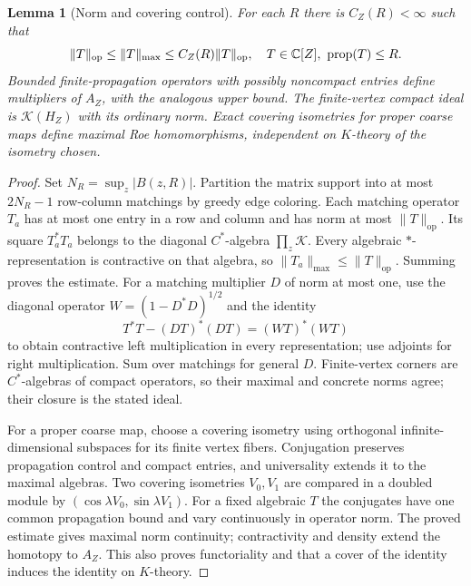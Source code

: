 \documentclass[11pt]{article}
\newtheorem{lemma}[theorem]{Lemma}
\theoremstyle{remark}\newtheorem{remark}[theorem]{Remark}
\newcommand{\prop}{\operatorname{prop}}\newcommand{\Ad}{\operatorname{Ad}}
\begin{document}
\begin{lemma}[Norm and covering control]\label{lem:norm}
For each $R$ there is $C_Z(R)<\infty$ such that
\[
 \|T\|_{\mathrm{op}}\leq\|T\|_{\max}
 \leq C_Z(R)\|T\|_{\mathrm{op}},\quad T\in\C[Z],\ \prop(T)\leq R.
\]
Bounded finite-propagation operators with possibly noncompact entries
define multipliers of $A_Z$, with the analogous upper bound.
The finite-vertex compact ideal is $\mathcal K(H_Z)$ with its ordinary norm.
Exact covering isometries for proper coarse maps define maximal Roe
homomorphisms, independent on $K$-theory of the isometry chosen.
\end{lemma}
\begin{proof}
Set $N_R=\sup_z|B(z,R)|$. Partition the matrix support into at most
$2N_R-1$ row-column matchings by greedy edge coloring. Each matching
operator $T_a$ has at most one entry in a row and column and has norm at
most $\|T\|_{\mathrm{op}}$. Its square $T_a^*T_a$ belongs to the diagonal
$C^*$-algebra $\prod_z\mathcal K$. Every algebraic $*$-representation is
contractive on that algebra, so $\|T_a\|_{\max}\leq\|T\|_{\mathrm{op}}$.
Summing proves the estimate. For a matching multiplier $D$ of norm at most
one, use the diagonal operator $W=(1-D^*D)^{1/2}$ and the identity
\[
 T^*T-(DT)^*(DT)=(WT)^*(WT)
\]
to obtain contractive left multiplication in every representation; use
adjoints for right multiplication. Sum over matchings for general $D$.
Finite-vertex corners are $C^*$-algebras of compact operators, so their
maximal and concrete norms agree; their closure is the stated ideal.

For a proper coarse map, choose a covering isometry using orthogonal
infinite-dimensional subspaces for its finite vertex fibers. Conjugation
preserves propagation control and compact entries, and universality extends
it to the maximal algebras. Two covering isometries $V_0,V_1$ are compared
in a doubled module by $(\cos\lambda V_0,\sin\lambda V_1)$.
For a fixed algebraic $T$ the conjugates have one common propagation bound
and vary continuously in operator norm. The proved estimate gives maximal
norm continuity; contractivity and density extend the homotopy to $A_Z$.
This also proves functoriality and that a cover of the identity induces the
identity on $K$-theory.
\end{proof}
\end{document}
